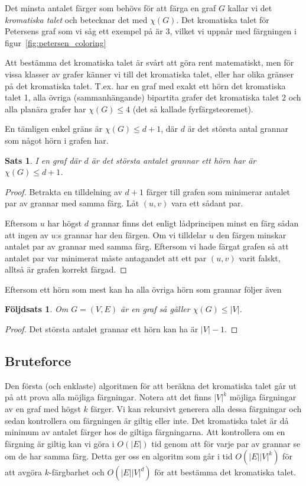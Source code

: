 \documentclass[a4paper]{report}
\newtheorem{theorem}{Sats}
\newtheorem{corollary}{Följdsats}
\begin{document}
Det minsta antalet färger som behövs för att färga en graf $G$ kallar vi det \emph{kromatiska talet} och betecknar det med $\chi(G)$. Det kromatiska talet för Petersens graf som vi såg ett exempel på är 3, vilket vi uppnår med färgningen i figur~\ref{fig:petersen_coloring}

Att bestämma det kromatiska talet är svårt att göra rent matematiskt, men för vissa klasser av grafer känner vi till det kromatiska talet, eller har olika
gränser på det kromatiska talet. T.ex. har en graf med exakt ett hörn det kromatiska talet 1, alla övriga (sammanhängande) bipartita grafer det kromatiska talet 2 och alla planära
grafer har $\chi(G)\le 4$ (det så kallade fyrfärgsteoremet).

En tämligen enkel gräns är $\chi(G) \le d + 1$, där $d$ är det största antal grannar som något hörn i grafen har.


\begin{theorem}
    I en graf där $d$ är det största antalet grannar ett hörn har är $\chi(G) \le d + 1$.
\end{theorem}

\begin{proof}
    Betrakta en tilldelning av $d+1$ färger till grafen som minimerar antalet par av grannar med samma färg. Låt $(u, v)$ vara ett sådant par.

    Eftersom $u$ har högst $d$ grannar finns det enligt lådprincipen minst en färg sådan att ingen av $u$:s grannar har den färgen. Om vi tilldelar
    $u$ den färgen minskar antalet par av grannar med samma färg. Eftersom vi hade färgat grafen så att antalet par var minimerat måste
    antagandet att ett par $(u, v)$ varit falskt, alltså är grafen korrekt färgad.
\end{proof}

Eftersom ett hörn som mest kan ha alla övriga hörn som grannar följer även

\begin{corollary}
    Om $G = (V, E)$ är en graf så gäller $\chi(G)\le|V|$.
\end{corollary}
\begin{proof}
    Det största antalet grannar ett hörn kan ha är $|V| - 1$.
\end{proof}

\subsection{Bruteforce}
Den första (och enklaste) algoritmen för att beräkna det kromatiska talet går ut på att prova alla möjliga färgningar. Notera att det finns $|V|^k$ möjliga färgningar av en graf med högst $k$ färger. Vi kan rekursivt generera alla dessa färgningar och sedan kontrollera om färgningen är giltig eller inte. Det kromatiska talet är då minimum av antalet färger hos de giltiga färgningarna. Att kontrollera om en färgning är giltig kan vi göra i $O(|E|)$ tid genom att för varje par av grannar se om de har samma färg. Detta ger oss en algoritm som går i tid $O(|E||V|^k)$ för att avgöra $k$-färgbarhet och $O(|E||V|^{d})$ för att bestämma det kromatiska talet.
\end{document}
